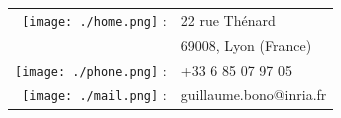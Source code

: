 \documentclass[a4paper]{article}
\begin{document}
\thispagestyle{empty}

\hfill
\begin{minipage}[t]{.5\textwidth}
	\flushright
	\setlength{\tabcolsep}{2pt}
	\begin{tabular}{r l}
		\texttt{[image: ./home.png]} : &
			22 rue Thénard \\
		 &
			69008, Lyon (France) \\

		\texttt{[image: ./phone.png]} : &
			+33 6 85 07 97 05 \\
		\texttt{[image: ./mail.png]} : &
			guillaume.bono@inria.fr
	\end{tabular}
\end{minipage}

\vfill

\centering
{}

\vfill
\end{document}
